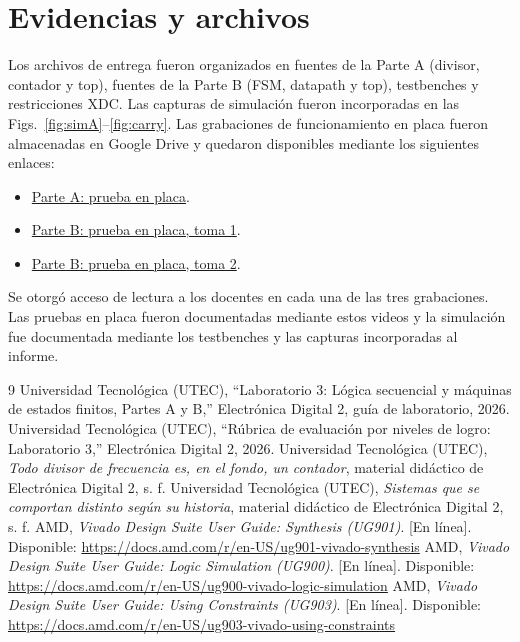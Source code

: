 \section*{Evidencias y archivos}
Los archivos de entrega fueron organizados en fuentes de la Parte A (divisor, contador y top), fuentes de la Parte B (FSM, datapath y top), testbenches y restricciones XDC. Las capturas de simulación fueron incorporadas en las Figs.~\ref{fig:simA}--\ref{fig:carry}. Las grabaciones de funcionamiento en placa fueron almacenadas en Google Drive y quedaron disponibles mediante los siguientes enlaces:
\begin{itemize}
\item \href{https://drive.google.com/file/d/1cQlbDqRuZeOSxJrXb2pYRw4xjVPU_4Vz/view?usp=drivesdk}{Parte A: prueba en placa}.
\item \href{https://drive.google.com/file/d/17ROMVnRz38RnD50s2zLfR_cplsoflzGw/view?usp=drivesdk}{Parte B: prueba en placa, toma 1}.
\item \href{https://drive.google.com/file/d/1BYkzmqP2yA4Zs2O5kWoa41vg2EHF4XHF/view?usp=drivesdk}{Parte B: prueba en placa, toma 2}.
\end{itemize}
Se otorgó acceso de lectura a los docentes en cada una de las tres grabaciones. Las pruebas en placa fueron documentadas mediante estos videos y la simulación fue documentada mediante los testbenches y las capturas incorporadas al informe.

\begin{thebibliography}{9}
 Universidad Tecnológica (UTEC), ``Laboratorio 3: Lógica secuencial y máquinas de estados finitos, Partes A y B,'' Electrónica Digital 2, guía de laboratorio, 2026.
 Universidad Tecnológica (UTEC), ``Rúbrica de evaluación por niveles de logro: Laboratorio 3,'' Electrónica Digital 2, 2026.
 Universidad Tecnológica (UTEC), \emph{Todo divisor de frecuencia es, en el fondo, un contador}, material didáctico de Electrónica Digital 2, s. f.
 Universidad Tecnológica (UTEC), \emph{Sistemas que se comportan distinto según su historia}, material didáctico de Electrónica Digital 2, s. f.
 AMD, \emph{Vivado Design Suite User Guide: Synthesis (UG901)}. [En línea]. Disponible: \url{https://docs.amd.com/r/en-US/ug901-vivado-synthesis}
 AMD, \emph{Vivado Design Suite User Guide: Logic Simulation (UG900)}. [En línea]. Disponible: \url{https://docs.amd.com/r/en-US/ug900-vivado-logic-simulation}
 AMD, \emph{Vivado Design Suite User Guide: Using Constraints (UG903)}. [En línea]. Disponible: \url{https://docs.amd.com/r/en-US/ug903-vivado-using-constraints}
\end{thebibliography}


